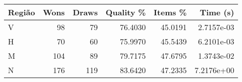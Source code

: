 \begin{tabular}{lrrrrr}
\hline
Região & Wons & Draws & Quality \% & Items \% & Time (s)   \\
\hline
V      & 98   & 79    & 76.4030    & 45.0191  & 2.7157e-03 \\
H      & 70   & 60    & 75.9970    & 45.5439  & 6.2101e-03 \\
M      & 104  & 89    & 79.7175    & 47.6795  & 1.3743e-02 \\
N      & 176  & 119   & 83.6420    & 47.2335  & 7.2176e+00 \\
\hline
\end{tabular}